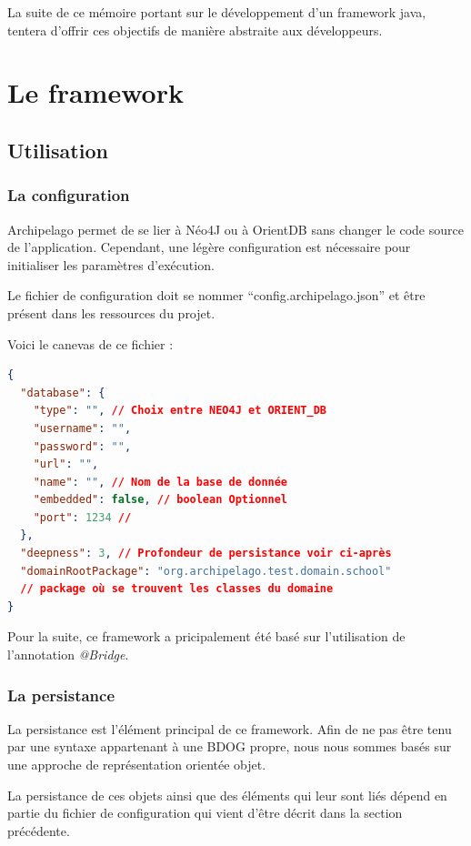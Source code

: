 \documentclass[a4paper,fleqn,12pt]{report}
\begin{document}
La suite de ce mémoire portant sur le développement d'un framework java, tentera d'offrir ces objectifs de manière abstraite aux développeurs.

\chapter{Le framework}
\section{Utilisation}
\label{opérations}
\subsection{La configuration}

Archipelago permet de se lier à Néo4J ou à OrientDB sans changer le code source de l'application. 
Cependant, une légère configuration est nécessaire pour initialiser les paramètres d'exécution.

Le fichier de configuration doit se nommer \enquote{config.archipelago.json} et être présent dans les ressources du projet.

Voici le canevas de ce fichier :

\begin{lstlisting}[language=json]
{
  "database": {
    "type": "", // Choix entre NEO4J et ORIENT_DB
    "username": "",
    "password": "",
    "url": "",
    "name": "", // Nom de la base de donnée
    "embedded": false, // boolean Optionnel
    "port": 1234 // 
  },
  "deepness": 3, // Profondeur de persistance voir ci-après
  "domainRootPackage": "org.archipelago.test.domain.school" 
  // package où se trouvent les classes du domaine 
}
\end{lstlisting}

Pour la suite, ce framework a pricipalement été basé sur l'utilisation de l'annotation \textit{@Bridge}.

\subsection{La persistance}


La persistance est l'élément principal de ce framework. Afin de ne pas être tenu par une syntaxe appartenant à une BDOG propre, nous nous sommes basés sur une approche de représentation orientée objet. 

La persistance de ces objets ainsi que des éléments qui leur sont liés dépend en partie du fichier de configuration qui vient d'être décrit dans la section précédente. 
\end{document}
